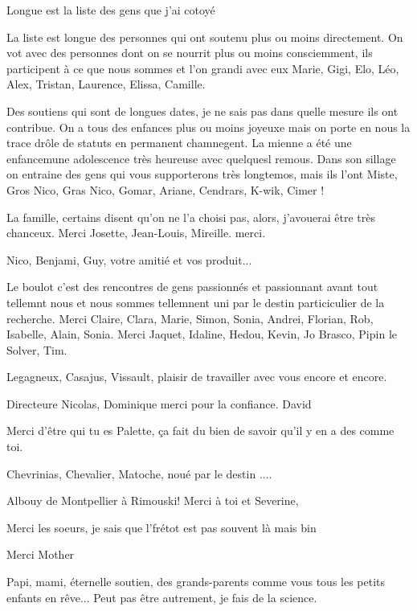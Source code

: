 Longue est la liste des gens que j'ai cotoyé

La liste est longue des personnes qui ont soutenu plus ou moins directement.
On vot avec des personnes dont on se nourrit plus ou moins consciemment, ils participent à ce que nous sommes et l'on grandi avec eux Marie, Gigi, Elo, Léo, Alex, Tristan, Laurence, Elissa, Camille.

Des soutiens qui sont de longues dates, je ne sais pas dans quelle mesure ils ont contribue. On a tous des enfances plus ou moins joyeuxe mais on porte en nous la trace drôle de statuts en permanent chamnegent. La mienne a été une enfancemune adolescence très heureuse avec quelquesl remous. Dans son sillage on entraine des gens qui vous supporterons très longtemos, mais ils l'ont Miste, Gros Nico, Gras Nico, Gomar, Ariane, Cendrars, K-wik, Cimer !

La famille, certains disent qu'on ne l'a choisi pas, alors, j'avouerai être très chanceux. Merci Josette, Jean-Louis, Mireille. merci.

Nico, Benjami, Guy, votre amitié et vos produit...

Le boulot c'est des rencontres de gens passionnés et passionnant avant tout tellemnt nous et nous sommes tellemnent uni par le destin particiculier de la recherche. Merci Claire, Clara, Marie, Simon, Sonia, Andrei, Florian, Rob, Isabelle, Alain, Sonia. Merci Jaquet, Idaline, Hedou, Kevin, Jo Brasco, Pipin le Solver, Tim.

Legagneux, Casajus, Vissault, plaisir de travailler avec vous encore et encore.

Directeure Nicolas, Dominique merci pour la confiance. David

Merci d'être qui tu es Palette, ça fait du bien de savoir qu'il y en a des comme toi.

Chevrinias, Chevalier, Matoche, noué par le destin  ....

Albouy de Montpellier à Rimouski! Merci à toi et Severine,

Merci les soeurs, je sais que l'frétot est pas souvent là mais bin

Merci Mother

Papi, mami, éternelle soutien, des grands-parents comme vous tous les petits enfants en rêve... Peut pas être autrement, je fais de la science.







